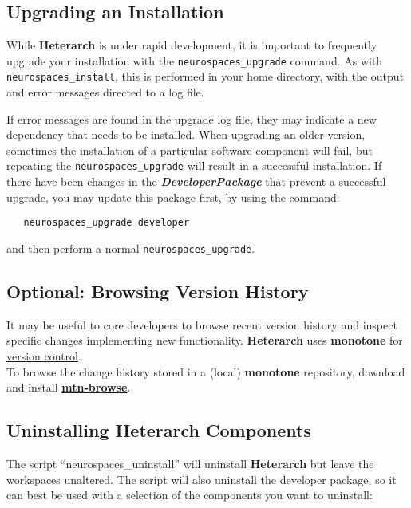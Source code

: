 \documentclass[12pt]{article}
\begin{document}
\subsection*{Upgrading an Installation}

While {\bf\small{Heterarch}} is under rapid development, it is important to frequently
upgrade your installation with the {\tt neurospaces\_upgrade} command.
As with {\tt neurospaces\_install}, this is performed in your home
directory, with the output and error messages directed to a log file.

If error messages are found in the upgrade log file, they may indicate
a new dependency that needs to be installed.  When upgrading an older
version, sometimes the installation of a particular software component
will fail, but repeating the {\tt neurospaces\_upgrade} will result in a
successful installation.  If there have been changes in the {\bf{\emph{DeveloperPackage}}} that prevent a successful upgrade, you may update
this package first, by using the command:

\begin{verbatim}
   neurospaces_upgrade developer
\end{verbatim}
and then perform a normal {\tt neurospaces\_upgrade}.
 
\subsection*{Optional: Browsing Version History}

It may be useful to core developers to browse recent version history
and inspect specific changes implementing new functionality.  {\bf\small Heterarch} uses {\bf monotone} for
\href{../version-control/version-control.tex}{version control}.\\
To browse the change history stored in a (local) {\bf monotone}
repository,
 download and install \href{http://www.coosoft.plus.com/software.html}{\bf mtn-browse}.


\subsection*{Uninstalling Heterarch Components}

The script ``neurospaces\_uninstall'' will uninstall
{\bf\small{Heterarch}} but leave the workspaces unaltered.  The script
will also uninstall the developer package, so it can best be used with
a selection of the components you want to uninstall:
\end{document}
